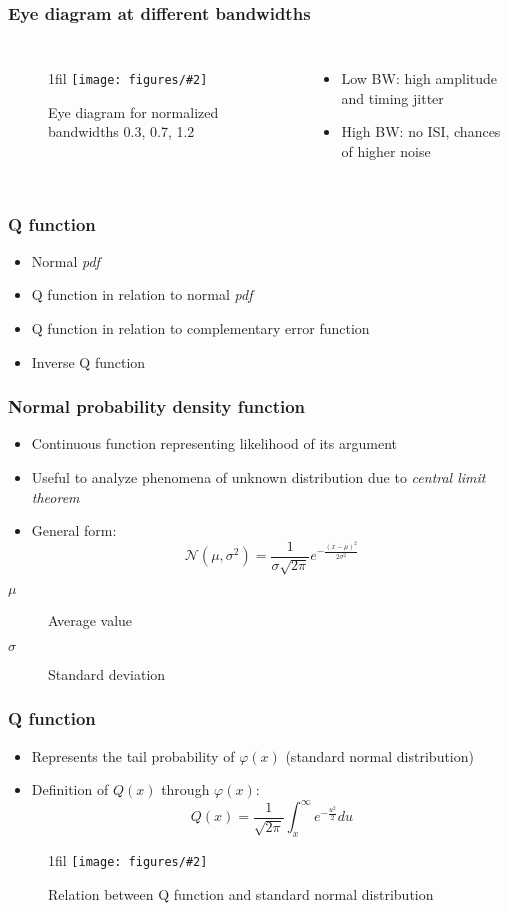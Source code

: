 \documentclass{beamer}
\makeatletter
\newcommand*{\centerfloat}{%
  \parindent \z@
  \leftskip \z@ \@plus 1fil \@minus \textwidth
  \rightskip\leftskip
  \parfillskip \z@skip}
\newcommand{\fig}[3]{
  \begin{figure}[H]
  \centerfloat
    \texttt{[image: figures/\#2]}
	\caption{#3}
  \end{figure}
}
\makeatother
\begin{document}
\begin{frame}
	\frametitle{Eye diagram at different bandwidths}
	\begin{columns}
			\fig{8cm}{eye2.png}{Eye diagram for normalized bandwidths 0.3, 0.7, 1.2}
			\begin{itemize}
				\item Low BW: high amplitude and timing jitter
				\item High BW: no ISI, chances of higher noise
			\end{itemize}
	\end{columns}
\end{frame}


\begin{frame}
	\frametitle{Q function}
	\begin{itemize}
		\item Normal \emph{pdf}
		\item Q function in relation to normal \emph{pdf}
		\item Q function in relation to complementary error function
		\item Inverse Q function
	\end{itemize}
\end{frame}

\begin{frame}
	\frametitle{Normal probability density function}
	\begin{itemize}
		\item Continuous function representing likelihood of its argument
		\item Useful to analyze phenomena of unknown distribution due to \emph{central limit theorem}
		\item General form:
		\begin{equation}
			\mathcal{N}(\mu, \sigma^2) = \frac{1}{\sigma \sqrt{2 \pi}} e^{-\frac{(x - \mu)^2}{2 \sigma^2}}
		\end{equation}
	\end{itemize}
	\begin{description}
		\item[$\mu$] Average value
		\item[$\sigma$] Standard deviation
	\end{description}
\end{frame}

\begin{frame}
	\frametitle{Q function}
	\begin{itemize}
		\item Represents the tail probability of  $\varphi(x)$ (standard normal distribution)
		\item Definition of $Q(x)$ through $\varphi(x)$:
		\begin{equation}
			Q(x) = \frac{1}{\sqrt{2 \pi}} \int_x^\infty e^{-\frac{u^2}{2}} du
		\end{equation}
	\end{itemize}
	\fig{2.5cm}{q1.png}{Relation between Q function and standard normal distribution}
\end{frame}
\end{document}
